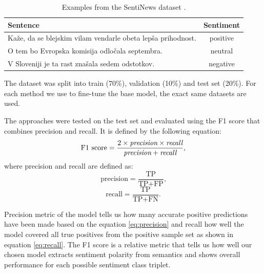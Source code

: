 \documentclass[fleqn,moreauthors,10pt]{ds_report}
\begin{document}
\begin{table}[!h]
	\footnotesize
	\begin{center}
		\begin{tabular}{ |l|c| }
		\hline
		\rowcolor{Blue}Sentence & Sentiment \\
		\hline

		Kaže, da se blejskim vilam vendarle obeta lepša prihodnost. & positive\\
		O tem bo Evropska komisija odločala septembra. & neutral\\
		V Sloveniji je ta rast znašala sedem odstotkov. & negative\\

		\hline
		\end{tabular}
	\end{center}
\caption{Examples from the SentiNews dataset \cite{sentiNews}.}
\label{tab1}
\end{table}

The dataset was split into train (70\%), validation (10\%) and test set (20\%). For each method we use to fine-tune the base model, the exact same datasets are used.

The approaches were tested on the test set and evaluated using the F1 score that combines precision and recall. It is defined by the following equation:
\begin{equation}
	\text{F1 score} =\frac{2 \times \text{\it{precision}} \times \text{\it{recall}}}{\text{\it{precision}} + \text{\it{recall}}} \text{,}
\label{eq:f1}
\end{equation}
where precision and recall are defined as:
\begin{equation}
	\text{precision} =\frac {\text{TP}}{\text{TP} + \text{FP}} \text{,}
\label{eq:precision}
\end{equation}
\begin{equation}
	\text{recall} =\frac {\text{TP}}{\text{TP} + \text{FN}} \text{.}
\label{eq:recall}
\end{equation}

Precision metric of the model tells us how many accurate positive predictions have been made based on the equation \ref{eq:precision} and recall how well the model covered all true positives from the positive sample set as shown in equation \ref{eq:recall}. The F1 score is a relative metric that tells us how well our chosen model extracts sentiment polarity from semantics and shows overall performance for each possible sentiment class triplet.
\end{document}
